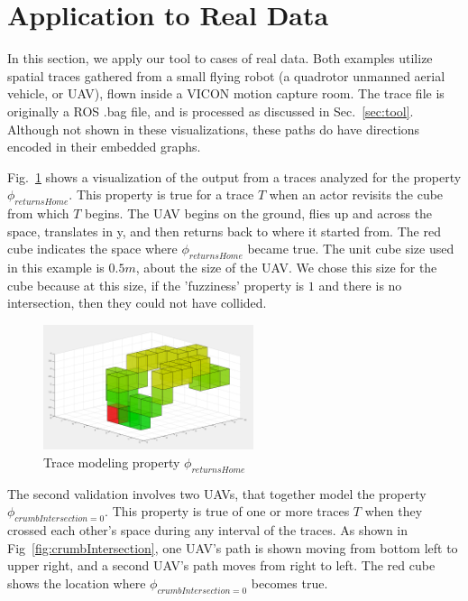 \section{Application to Real Data}
\label{sec:application}

In this section, we apply our tool to cases of real data.
Both examples utilize spatial traces gathered from a small flying robot (a quadrotor unmanned aerial vehicle, or UAV), flown inside a VICON motion capture room.
The trace file is originally a ROS .bag file, and is processed as discussed in Sec.~\ref{sec:tool}. 
Although not shown in these visualizations, these paths do have directions encoded in their embedded graphs.

Fig.~\ref{fig:returnsHome} shows a visualization of the output from a traces analyzed for the property $\phi_{returnsHome}$.
This property is true for a trace $T$ when an actor revisits the cube from which $T$ begins.
The UAV begins on the ground, flies up and across the space, translates in y, and then returns back to where it started from.
The red cube indicates the space where $\phi_{returnsHome}$ became true.
The unit cube size used in this example is $0.5m$, about the size of the UAV.
We chose this size for the cube because at this size, if the 'fuzziness' property is $1$ and there is no intersection, then they could not have collided.


\begin{figure}
  \centering
  \includegraphics[width=0.55\textwidth]{./figures/returnsHome}
    \caption{Trace modeling property $\phi_{returnsHome}$}
    \label{fig:returnsHome}
\end{figure}

The second validation involves two UAVs, that together model the property $\phi_{crumbIntersection=0}$.
This property is true of one or more traces $T$ when they crossed each other's space during any interval of the traces.
As shown in Fig~\ref{fig:crumbIntersection}, one UAV's path is shown moving from bottom left to upper right, and a second UAV's path moves from right to left.
The red cube shows the location where $\phi_{crumbIntersection=0}$ becomes true.


